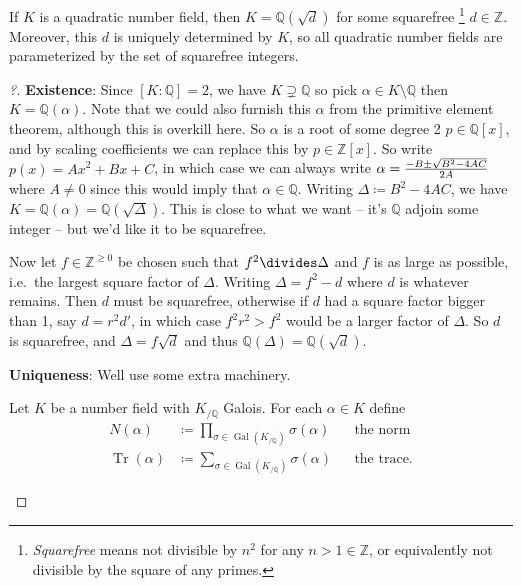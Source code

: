 \begin{proposition}[?]

If \(K\) is a quadratic number field, then
\(K = {\mathbb{Q}}(\sqrt{d})\) for some squarefree \footnote{\emph{Squarefree}
  means not divisible by \(n^2\) for any \(n > 1\in {\mathbb{Z}}\), or
  equivalently not divisible by the square of any primes.}
\(d\in {\mathbb{Z}}\). Moreover, this \(d\) is uniquely determined by
\(K\), so all quadratic number fields are parameterized by the set of
squarefree integers.

\end{proposition}

\begin{proof}[?]

\textbf{Existence}: Since \([K: {\mathbb{Q}}] = 2\), we have
\(K\supsetneq {\mathbb{Q}}\) so pick
\(\alpha\in K\setminus{\mathbb{Q}}\) then \(K = {\mathbb{Q}}(\alpha)\).
Note that we could also furnish this \(\alpha\) from the primitive
element theorem, although this is overkill here. So \(\alpha\) is a root
of some degree 2 \(p\in {\mathbb{Q}}[x]\), and by scaling coefficients
we can replace this by \(p\in {\mathbb{Z}}[x]\). So write
\(p(x) = Ax^2 + Bx + C\), in which case we can always write
\(\alpha = {-B \pm \sqrt{B^2 - 4AC} \over 2A}\) where \(A\neq 0\) since
this would imply that \(\alpha\in{\mathbb{Q}}\). Writing
\(\Delta\coloneqq B^2 - 4AC\), we have
\(K = {\mathbb{Q}}(\alpha) = {\mathbb{Q}}(\sqrt{\Delta})\). This is
close to what we want -- it's \({\mathbb{Q}}\) adjoin some integer --
but we'd like it to be squarefree.

Now let \(f\in {\mathbb{Z}}^{\geq 0}\) be chosen such that
\(f^2 \divides \Delta\) and \(f\) is as large as possible, i.e.~the
largest square factor of \(\Delta\). Writing \(\Delta = f^2 - d\) where
\(d\) is whatever remains. Then \(d\) must be squarefree, otherwise if
\(d\) had a square factor bigger than 1, say \(d = r^2 d'\), in which
case \(f^2 r^2 > f^2\) would be a larger factor of \(\Delta\). So \(d\)
is squarefree, and \(\Delta = f \sqrt d\) and thus
\({\mathbb{Q}}(\Delta) = {\mathbb{Q}}(\sqrt{d})\).

\textbf{Uniqueness}: Well use some extra machinery.

\begin{definition}

Let \(K\) be a number field with \(K_{/{\mathbb{Q}}}\) Galois. For each
\(\alpha\in K\) define
\begin{align*}
N(\alpha) &\coloneqq\prod_{\sigma\in \operatorname{Gal}(K_{/{\mathbb{Q}}})} \sigma(\alpha) && \text{the norm} \\
\operatorname{Tr}(\alpha) &\coloneqq\sum_{\sigma\in \operatorname{Gal}(K_{/{\mathbb{Q}}})} \sigma(\alpha) && \text{the trace}
.\end{align*}


\end{definition}
\end{proof}
